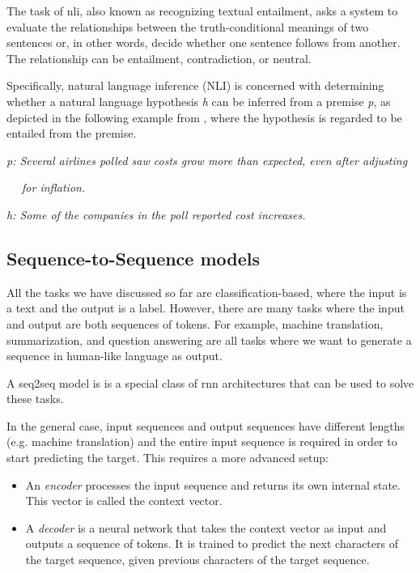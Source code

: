 The task of \acrfull{nli}, also
known as recognizing textual entailment,
asks a system to evaluate the relationships between
the truth-conditional meanings of two sentences
or, in other words, decide whether one sentence
follows from another.
The relationship can be entailment, contradiction, or neutral.

Specifically, natural language inference (NLI)
is concerned with determining whether a natural language hypothesis \emph{h} can be inferred from a
premise \emph{p}, as depicted in the following example
from \cite{Manning2009NaturalLI}, where the hypothesis is
regarded to be entailed from the premise.

\emph{p: Several airlines polled saw costs grow more than
expected, even after adjusting}
\par
\emph{$\quad$ for inflation.}
\par
\emph{h: Some of the companies in the poll reported cost
increases.}



\subsection[Seq2Seq]{Sequence-to-Sequence models}\label{subsec:seq2seq}

All the tasks we have discussed so far are classification-based, where the input is a text and the output is a label. However, there are many tasks where the input and output are both sequences of tokens. 
For example, machine translation, summarization, and question answering are all tasks where we want to generate a sequence in human-like language as output.

A \acrfull{seq2seq} model is  is a special class of \acrfull{rnn} architectures  that can be used to solve these tasks.

In the general case, input sequences and output sequences have different lengths (e.g. machine translation) and the entire input sequence is required in order to start predicting the target. This requires a more advanced setup:
\begin{itemize}
    \item An \emph{encoder} processes the input sequence and returns its own internal state. This vector is called the context vector.
    \item A \emph{decoder} is a neural network that takes the context vector as input and outputs a sequence of tokens. It is trained to predict the next characters of the target sequence, given previous characters of the target sequence. 
\end{itemize}


